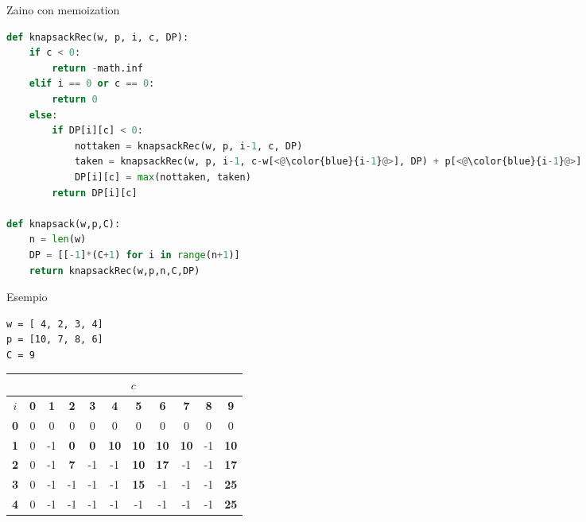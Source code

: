 \begin{frame}[fragile,shrink=5]{Zaino con memoization}

\vspace{-9pt}
\begin{lstlisting}[language=python,tabsize=2]
def knapsackRec(w, p, i, c, DP):
	if c < 0:
		return -math.inf
	elif i == 0 or c == 0:
		return 0
	else:
		if DP[i][c] < 0:
			nottaken = knapsackRec(w, p, i-1, c, DP)
			taken = knapsackRec(w, p, i-1, c-w[<@\color{blue}{i-1}@>], DP) + p[<@\color{blue}{i-1}@>]
			DP[i][c] = max(nottaken, taken)
		return DP[i][c]

def knapsack(w,p,C):
	n = len(w)
	DP = [[-1]*(C+1) for i in range(n+1)]
	return knapsackRec(w,p,n,C,DP)
\end{lstlisting}

\end{frame}

\begin{frame}[fragile]{Esempio}

\begin{lstlisting}
w = [ 4, 2, 3, 4]
p = [10, 7, 8, 6]
C = 9  
\end{lstlisting}

\bigskip
\begin{tabular}{|c|c|c|c|c|c|c|c|c|c|c|}
\hline
& \multicolumn{10}{c|}{$c$} \\\hline
$i$ & \textbf{0} & \textbf{1} & \textbf{2} & \textbf{3} & \textbf{4} & \textbf{5} & \textbf{6} & \textbf{7} & \textbf{8} & \textbf{9}  \\\hline
\bf{0} & 0 &  0 &  0 &  0 &  0 &  0 &  0 &  0 &  0 &  0 \\\hline
\bf{1} & 0 &  -1 &  \alert{\bf 0} &  \alert{\bf 0} & \alert{\bf 10} & \alert{\bf 10} & \alert{\bf 10} & \alert{\bf 10} & -1 & \alert{\bf 10} \\\hline
\bf{2} & 0 &  -1 &  \alert{\bf 7} & -1 & -1 & \alert{\bf 10} & \alert{\bf 17} & -1 & -1 & \alert{\bf 17} \\\hline
\bf{3} & 0 &  -1 &  -1 &  -1 & -1 & \alert{\bf 15} & -1 & -1 & -1 & \alert{\bf 25} \\\hline
\bf{4} & 0 &  -1 &  -1 &  -1 & -1 & -1 & -1 & -1 & -1 & \alert{\bf 25} \\\hline  
\end{tabular}  
  
\end{frame}

